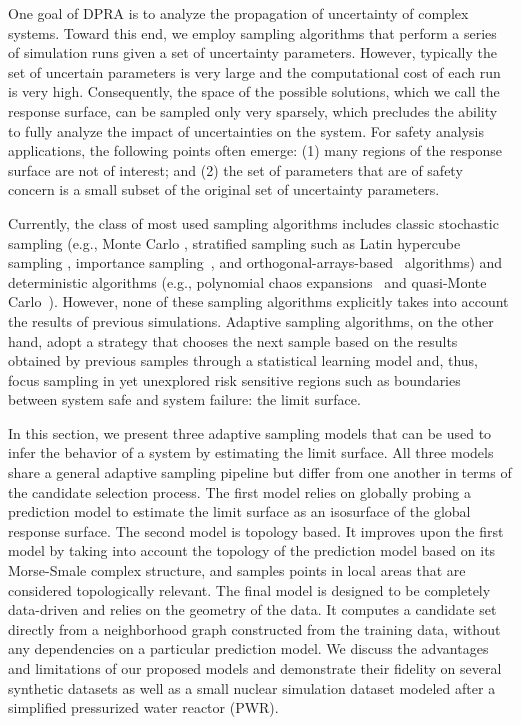 One goal of DPRA is to analyze the propagation of uncertainty of complex systems.
%
Toward this end, we employ sampling algorithms that perform a series of simulation runs given a set of uncertainty parameters.
%
However, typically the set of uncertain parameters is very large and the computational cost of each run is very high.
%
Consequently, the space of the possible solutions, which we call the response surface, can be sampled only very sparsely, which precludes the ability to fully analyze the impact of uncertainties on the system.
%
For safety analysis applications, the following points often emerge: (1) many regions of the response surface are not of interest; and (2) the set of parameters that are of safety concern is a small subset of the original set of uncertainty parameters.

Currently, the class of most used sampling algorithms includes classic stochastic sampling (e.g., Monte Carlo \cite{Hastings1970,Liu2001}, stratified sampling such as Latin hypercube sampling \cite{HeltonDavis2003}, importance sampling~\cite{Geweke1989}, and orthogonal-arrays-based~\cite{Owen1992} algorithms) and deterministic algorithms (e.g., polynomial chaos expansions~\cite{Najm2009} and quasi-Monte Carlo~\cite{Caflisch1998}).
%
However, none of these sampling algorithms explicitly takes into account the results of previous simulations.
%
Adaptive sampling algorithms, on the other hand, adopt a strategy that chooses the next sample based on the results obtained by previous samples through a statistical learning model and, thus, focus sampling in yet unexplored risk sensitive regions such as boundaries between system safe and system failure: the limit surface.

In this section, we present three adaptive sampling models that can be used to infer the behavior of a system by estimating the limit surface.
%
All three models share a general adaptive sampling pipeline but differ from one another in terms of the candidate selection process.
%
The first model relies on globally probing a prediction model to estimate the limit surface as an isosurface of the global response surface.
%
The second model is topology based.
%
It improves upon the first model by taking into account the topology of the prediction model based on its Morse-Smale complex structure, and samples points in local areas that are considered topologically relevant.
%
The final model is designed to be completely data-driven and relies on the geometry of the data. It computes a candidate set directly from a neighborhood graph constructed from the training data, without any dependencies on a particular prediction model.
%
We discuss the advantages and limitations of our proposed models and demonstrate their fidelity on several synthetic datasets as well as a small nuclear simulation dataset modeled after a simplified pressurized water reactor (PWR).

